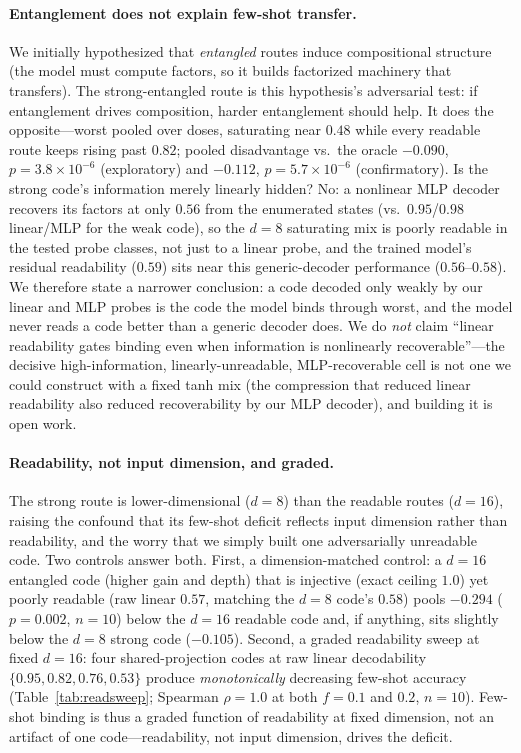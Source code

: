 \documentclass[10pt]{article} %
\begin{document}
\paragraph{Entanglement does not explain few-shot transfer.} We initially hypothesized that \emph{entangled} routes
induce compositional structure (the model must compute factors, so it builds factorized machinery
that transfers). The strong-entangled route is this hypothesis's adversarial test: if entanglement
drives composition, harder entanglement should help. It does the opposite---worst pooled over doses,
saturating near $0.48$ while every readable route keeps rising past $0.82$; pooled disadvantage
vs.\ the oracle $-0.090$, $p = 3.8\times10^{-6}$ (exploratory) and $-0.112$, $p = 5.7\times10^{-6}$
(confirmatory). Is the strong code's information merely linearly hidden? No: a nonlinear MLP
decoder recovers its factors at only $0.56$ from the enumerated states (vs.\ $0.95$/$0.98$ linear/MLP
for the weak code), so the $d{=}8$ saturating mix is poorly readable in the tested probe classes, not
just to a linear probe, and the trained model's residual readability ($0.59$) sits near this generic-decoder performance
($0.56$--$0.58$). We therefore state a narrower conclusion: a code decoded only weakly by our linear
and MLP probes is the code the model binds through worst, and the model never reads a code better
than a generic decoder does. We do \emph{not} claim ``linear readability gates binding even when
information is nonlinearly recoverable''---the decisive high-information, linearly-unreadable,
MLP-recoverable cell is not one we could construct with a fixed tanh mix (the compression that
reduced linear readability also reduced recoverability by our MLP decoder), and building it is open
work.

\paragraph{Readability, not input dimension, and graded.} The strong route is lower-dimensional
($d{=}8$) than the readable routes ($d{=}16$), raising the confound that its few-shot deficit
reflects input dimension rather than readability, and the worry that we simply built one
adversarially unreadable code. Two controls answer both. First, a dimension-matched control: a
$d{=}16$ entangled code (higher gain and depth) that is injective (exact ceiling $1.0$) yet poorly
readable (raw linear $0.57$, matching the $d{=}8$ code's $0.58$) pools $-0.294$ ($p=0.002$, $n{=}10$)
below the $d{=}16$ readable code and, if anything, sits slightly below the $d{=}8$ strong code
($-0.105$). Second, a graded readability sweep at fixed $d{=}16$: four shared-projection codes at raw
linear decodability $\{0.95, 0.82, 0.76, 0.53\}$ produce \emph{monotonically} decreasing few-shot
accuracy (Table~\ref{tab:readsweep}; Spearman $\rho{=}1.0$ at both $f{=}0.1$ and $0.2$, $n{=}10$).
Few-shot binding is thus a graded function of readability at fixed dimension, not an artifact of one
code---readability, not input dimension, drives the deficit.
\end{document}
